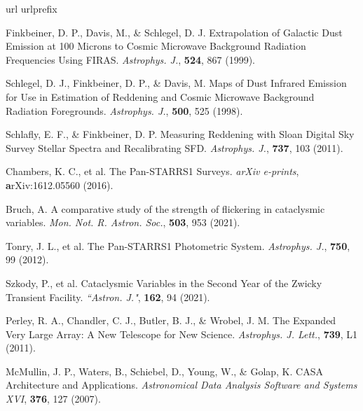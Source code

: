 \documentclass{nature_plusfigure}
\newcommand{\mn}{{Mon. Not. R. Astron. Soc.}}
\newcommand{\mnras}{\mn}
\newcommand{\aj}{{``Astron. J."}}
\newcommand{\apj}{{Astrophys. J.}}
\newcommand{\apjl}{{Astrophys. J. Lett.}}
\begin{document}
\begin{methods}
\vspace{1in}
%
%

\begin{thebibliography}{10}
\expandafter\ifx\csname url\endcsname\relax
  \def\url#1{\texttt{#1}}\fi
\expandafter\ifx\csname urlprefix\endcsname\relax\def\urlprefix{URL }\fi
\providecommand{\bibinfo}[2]{#2}
\providecommand{\eprint}[2][]{\url{#2}}
\makeatletter
\addtocounter{\@listctr}{37}
\makeatother


  Finkbeiner, D. P., Davis, M., \& Schlegel, D. J. Extrapolation of Galactic Dust Emission at 100 Microns to Cosmic Microwave Background Radiation Frequencies Using FIRAS. \emph{\apj}, \textbf{524}, 867 (1999). 
 
  Schlegel, D. J., Finkbeiner, D. P., \& Davis, M. Maps of Dust Infrared Emission for Use in Estimation of Reddening and Cosmic Microwave Background Radiation Foregrounds. \emph{\apj}, \textbf{500}, 525 (1998). 

  Schlafly, E. F., \& Finkbeiner, D. P. Measuring Reddening with Sloan Digital Sky Survey Stellar Spectra and Recalibrating SFD. \emph{\apj}, \textbf{737}, 103 (2011). 

 Chambers, K. C., et al. The Pan-STARRS1 Surveys. \emph{arXiv e-prints}, \textbf arXiv:1612.05560 (2016). 

 Bruch, A. A comparative study of the strength of flickering in cataclysmic variables. \emph{\mnras}, \textbf{503}, 953 (2021). 

 Tonry, J. L., et al. The Pan-STARRS1 Photometric System. \emph{\apj}, \textbf{750}, 99 (2012). 

 Szkody, P., et al. Cataclysmic Variables in the Second Year of the Zwicky Transient Facility. \emph{\aj}, \textbf{162}, 94 (2021). 

 Perley, R. A., Chandler, C. J., Butler, B. J., \& Wrobel, J. M. The Expanded Very Large Array: A New Telescope for New Science. \emph{\apjl}, \textbf{739}, L1 (2011). 

 McMullin, J. P., Waters, B., Schiebel, D., Young, W., \& Golap, K. CASA Architecture and Applications. \emph{Astronomical Data Analysis Software and Systems XVI}, \textbf{376}, 127 (2007). 


\end{thebibliography}
\end{methods}
\end{document}
